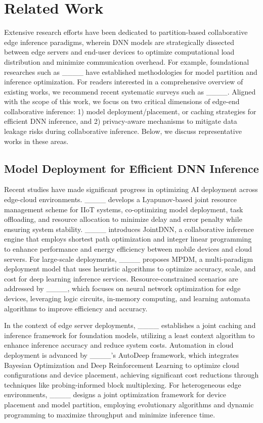 \section{Related Work}
Extensive research efforts have been dedicated to partition-based collaborative edge inference paradigms, wherein DNN models are strategically dissected between edge servers and end-user devices to optimize computational load distribution and minimize communication overhead. For example, foundational researches such as ____ have established methodologies for model partition and inference optimization. For readers interested in a comprehensive overview of existing works, we recommend recent systematic surveys such as ____. Aligned with the scope of this work, we focus on two critical dimensions of edge-end collaborative inference: 1) model deployment/placement, or caching strategies for efficient DNN inference, and 2) privacy-aware mechanisms to mitigate data leakage risks during collaborative inference. Below, we discuss representative works in these areas.

\subsection{Model Deployment for Efficient DNN Inference}
Recent studies have made significant progress in optimizing AI deployment across edge-cloud environments. ____ develops a Lyapunov-based joint resource management scheme for IIoT systems, co-optimizing model deployment, task offloading, and resource allocation to minimize delay and error penalty while ensuring system stability. ____ introduces JointDNN, a collaborative inference engine that employs shortest path optimization and integer linear programming to enhance performance and energy efficiency between mobile devices and cloud servers. For large-scale deployments, ____ proposes MPDM, a multi-paradigm deployment model that uses heuristic algorithms to optimize accuracy, scale, and cost for deep learning inference services. Resource-constrained scenarios are addressed by ____, which focuses on neural network optimization for edge devices, leveraging logic circuits, in-memory computing, and learning automata algorithms to improve efficiency and accuracy.

In the context of edge server deployments, ____ establishes a joint caching and inference framework for foundation models, utilizing a least context algorithm to enhance inference accuracy and reduce system costs. Automation in cloud deployment is advanced by ____'s AutoDeep framework, which integrates Bayesian Optimization and Deep Reinforcement Learning to optimize cloud configurations and device placement, achieving significant cost reductions through techniques like probing-informed block multiplexing. For heterogeneous edge environments, ____ designs a joint optimization framework for device placement and model partition, employing evolutionary algorithms and dynamic programming to maximize throughput and minimize inference time.

